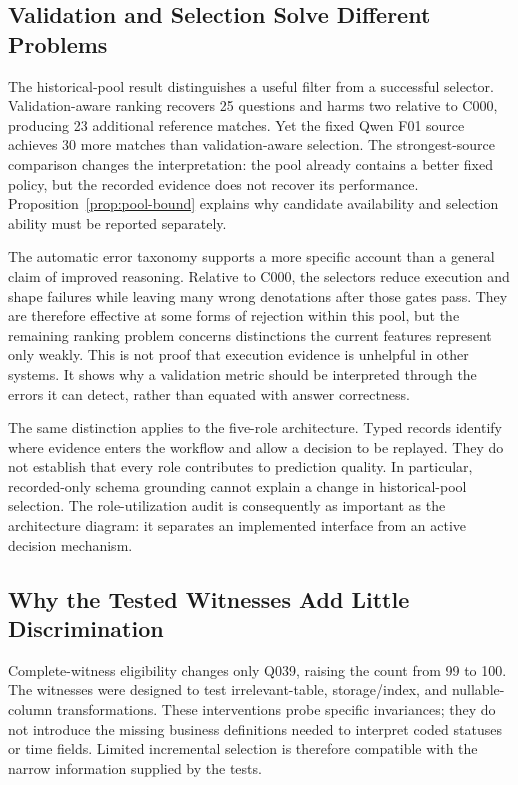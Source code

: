 \documentclass[information,article,submit,moreauthors]{Definitions/mdpi}
\begin{document}
\subsection{Validation and Selection Solve Different Problems}

The historical-pool result distinguishes a useful filter from a successful selector. Validation-aware ranking recovers 25 questions and harms two relative to C000, producing 23 additional reference matches. Yet the fixed Qwen F01 source achieves 30 more matches than validation-aware selection. The strongest-source comparison changes the interpretation: the pool already contains a better fixed policy, but the recorded evidence does not recover its performance. Proposition~\ref{prop:pool-bound} explains why candidate availability and selection ability must be reported separately.

The automatic error taxonomy supports a more specific account than a general claim of improved reasoning. Relative to C000, the selectors reduce execution and shape failures while leaving many wrong denotations after those gates pass. They are therefore effective at some forms of rejection within this pool, but the remaining ranking problem concerns distinctions the current features represent only weakly. This is not proof that execution evidence is unhelpful in other systems. It shows why a validation metric should be interpreted through the errors it can detect, rather than equated with answer correctness.

The same distinction applies to the five-role architecture. Typed records identify where evidence enters the workflow and allow a decision to be replayed. They do not establish that every role contributes to prediction quality. In particular, recorded-only schema grounding cannot explain a change in historical-pool selection. The role-utilization audit is consequently as important as the architecture diagram: it separates an implemented interface from an active decision mechanism.

\subsection{Why the Tested Witnesses Add Little Discrimination}

Complete-witness eligibility changes only Q039, raising the count from 99 to 100. The witnesses were designed to test irrelevant-table, storage/index, and nullable-column transformations. These interventions probe specific invariances; they do not introduce the missing business definitions needed to interpret coded statuses or time fields. Limited incremental selection is therefore compatible with the narrow information supplied by the tests.
\end{document}
